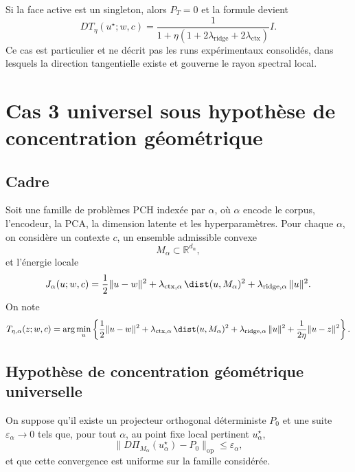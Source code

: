 Si la face active est un singleton, alors $P_T=0$ et la formule devient
\[
DT_\eta(u^\star;w,c)
=
\frac1{1+\eta(1+2\lambda_{\mathrm{ridge}}+2\lambda_{\mathrm{ctx}})}I.
\]
Ce cas est particulier et ne décrit pas les runs expérimentaux consolidés, dans lesquels la direction tangentielle existe et gouverne le rayon spectral local.









\section{Cas 3 universel sous hypothèse de concentration géométrique}

\subsection{Cadre}

Soit une famille de problèmes PCH indexée par \(\alpha\), où \(\alpha\) encode le corpus, l'encodeur, la PCA, la dimension latente et les hyperparamètres. Pour chaque \(\alpha\), on considère un contexte \(c\), un ensemble admissible convexe
\[
M_\alpha \subset \mathbb R^{d_\alpha},
\]
et l'énergie locale
\[
J_\alpha(u;w,c)
=
\frac12\|u-w\|^2
+
\lambda_{\mathrm{ctx},\alpha}\,\dist(u,M_\alpha)^2
+
\lambda_{\mathrm{ridge},\alpha}\,\|u\|^2.
\]
On note
\[
T_{\eta,\alpha}(z;w,c)
=
\arg\min_u
\left\{
\frac12\|u-w\|^2
+
\lambda_{\mathrm{ctx},\alpha}\,\dist(u,M_\alpha)^2
+
\lambda_{\mathrm{ridge},\alpha}\,\|u\|^2
+
\frac{1}{2\eta}\|u-z\|^2
\right\}.
\]

\subsection{Hypothèse de concentration géométrique universelle}

On suppose qu'il existe un projecteur orthogonal déterministe \(P_0\) et une suite \(\varepsilon_\alpha\to 0\) tels que, pour tout \(\alpha\), au point fixe local pertinent \(u_\alpha^\star\),
\[
\|D\Pi_{M_\alpha}(u_\alpha^\star)-P_0\|_{\mathrm{op}}
\le \varepsilon_\alpha,
\]
et que cette convergence est uniforme sur la famille considérée.


